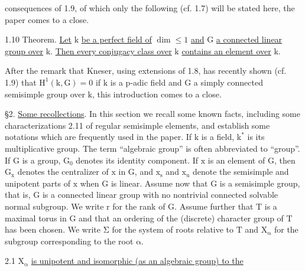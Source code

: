 consequences of 1.9, of which only the following (cf. 1.7) will be stated
here, the paper comes to a close.

1.10 Theorem. \uline{Let} $\mathrm{k}$ \uline{be a perfect field of} $\mathrm{\dim\leq 1}$ \uline{and} $\mathrm{G}$ \uline{a
connected linear group over} $\mathrm{k}$. \uline{Then every conjugacy class over} $\mathrm{k}$ \uline{contains
an element over} $\mathrm{k}$.

After the remark that Kneser, using extensions of 1.8, has recently shown
(cf. 1.9) that $\mathrm{H^1(k,G)=0}$ if $\mathrm{k}$ is a $\mathrm{p}$-adic field and $\mathrm{G}$ a simply connected
semisimple group over $\mathrm{k}$, this introduction comes to a close.

\S2. \uline{Some recollections}. In this section we recall some known facts,
including some characterizations 2.11 of regular semisimple elements, and
establish some notations which are frequently used in the paper. If $\mathrm{k}$ is
a field, $\mathrm{k^*}$ is its multiplicative group. The term ``algebraic group'' is
often abbreviated to ``group''. If $\mathrm{G}$ is a group, $\mathrm{G_0}$ denotes its identity
component. If $\mathrm{x}$ is an element of $\mathrm{G}$, then $\mathrm{G_x}$ denotes the centralizer
of $\mathrm{x}$ in $\mathrm{G}$, and $\mathrm{x_s}$ and $\mathrm{x_u}$ denote the semisimple and unipotent parts
of $\mathrm{x}$ when $\mathrm{G}$ is linear. Assume now that $\mathrm{G}$ is a semisimple group, that
is, $\mathrm{G}$ is a connected linear group with no nontrivial connected solvable
normal subgroup. We write $\mathrm{r}$ for the rank of $\mathrm{G}$. Assume further that $\mathrm{T}$
is a maximal torus in $\mathrm{G}$ and that an ordering of the (discrete) character
group of $\mathrm{T}$ has been chosen. We write $\mathrm{\Sigma}$ for the system of roots relative
to $\mathrm{T}$ and $\mathrm{X_\alpha}$ for the subgroup corresponding to the root $\mathrm{\alpha}$.

2.1 $\mathrm{X_\alpha}$ \uline{is unipotent and isomorphic (as an algebraic group) to the}

